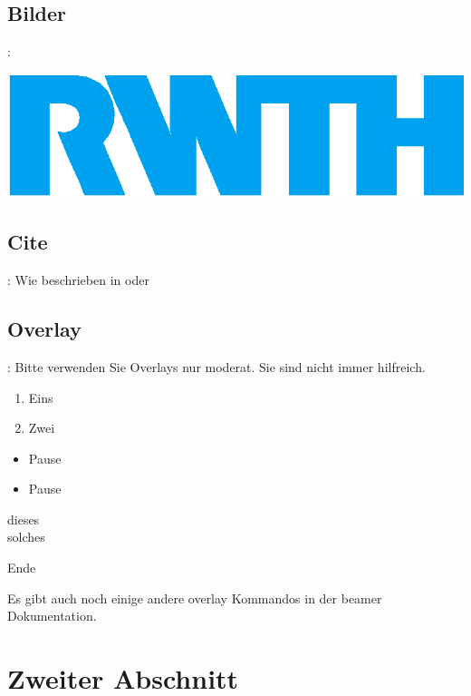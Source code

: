 \documentclass[xcolor=table,presentation]{beamer}    %
\begin{document}
\subsection{Bilder}
\begin{frame}{\insertsection: \insertsubsection}
\begin{center}
 \includegraphics[width=.5\linewidth]{logos/rwth-hks44}
\end{center}
\end{frame}

\subsection{Cite}
\begin{frame}{\insertsection: \insertsubsection}
Wie beschrieben in \cite{sayood96} oder \cite{salomon2007}
\end{frame}

\subsection{Overlay}
\begin{frame}{\insertsection: \insertsubsection}
Bitte verwenden Sie Overlays nur moderat. Sie sind nicht immer hilfreich.
\begin{enumerate}
 \item<1> Eins 
 \item<2> Zwei
\end{enumerate}
\begin{itemize}
 \item Pause \pause
 \item Pause \pause
\end{itemize}
\begin{description}
 \item[dieses] 
 \item[solches] 
\end{description}
Ende

Es gibt auch noch einige andere overlay Kommandos in der beamer Dokumentation.
\end{frame}


\section{Zweiter Abschnitt} \label{sec:zweite}
\end{document}

